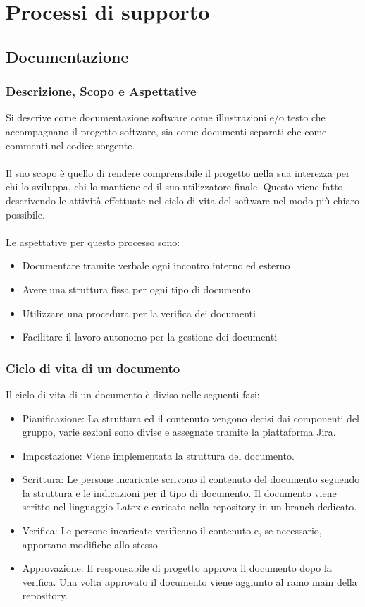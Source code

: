 \documentclass{article}
\begin{document}
\section{Processi di supporto}

\subsection{Documentazione}
\subsubsection{Descrizione, Scopo e Aspettative }
Si descrive come documentazione software come illustrazioni e/o testo che accompagnano il progetto software, sia come documenti separati che come commenti nel codice sorgente.\\ \\
Il suo scopo è quello di rendere comprensibile il progetto nella sua interezza per chi lo sviluppa, chi lo mantiene ed il suo utilizzatore finale. Questo viene fatto descrivendo le attività effettuate nel ciclo di vita del software nel modo più chiaro possibile.\\ \\
Le aspettative per questo processo sono:
\begin{itemize}
    \item Documentare tramite verbale ogni incontro interno ed esterno
    \item Avere una struttura fissa per ogni tipo di documento
    \item Utilizzare una procedura per la verifica dei documenti
    \item Facilitare il lavoro autonomo per la gestione dei documenti
\end{itemize}

\subsubsection{Ciclo di vita di un documento} \label{cicloDoc}
Il ciclo di vita di un documento è diviso nelle seguenti fasi:
\begin{itemize}
    \item Pianificazione: La struttura ed il contenuto vengono decisi dai componenti del gruppo, varie sezioni sono divise e assegnate tramite la piattaforma Jira.
    \item Impostazione: Viene implementata la struttura del documento.
    \item Scrittura: Le persone incaricate scrivono il contenuto del documento seguendo la struttura e le indicazioni per il tipo di documento. Il documento viene scritto nel linguaggio Latex e caricato nella repository in un branch dedicato.
    \item Verifica: Le persone incaricate verificano il contenuto e, se necessario, apportano modifiche allo stesso.
    \item Approvazione: Il responsabile di progetto approva il documento dopo la verifica. Una volta approvato il documento viene aggiunto al ramo main della repository.
\end{itemize}
\end{document}
